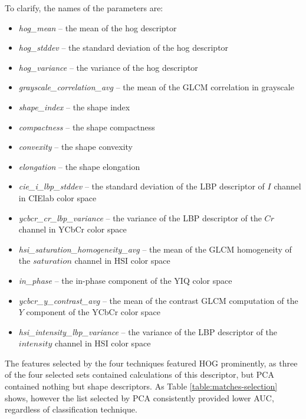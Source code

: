 \documentclass[letterpaper]{report}
\begin{document}
 To clarify, the names of the parameters are:
 \begin{itemize}
 	\item{\textit{hog\_mean} -- the mean of the hog descriptor}
 	\item{\textit{hog\_stddev} -- the standard deviation of the hog descriptor}
 	\item{\textit{hog\_variance} -- the variance of the hog descriptor}
 	\item{\textit{grayscale\_correlation\_avg} -- the mean of the GLCM correlation in grayscale}
 	\item{\textit{shape\_index} -- the shape index}
 	\item{\textit{compactness} -- the shape compactness}
 	\item{\textit{convexity} -- the shape convexity}
 	\item{\textit{elongation} -- the shape elongation}
 	\item{\textit{cie\_i\_lbp\_stddev} -- the standard deviation of the LBP descriptor of $I$ channel in CIElab color space}
 	\item{\textit{ycbcr\_cr\_lbp\_variance} -- the variance of the LBP descriptor of the $Cr$ channel in YCbCr color space}
 	\item{\textit{hsi\_saturation\_homogeneity\_avg} -- the mean of the GLCM homogeneity of the $saturation$ channel in HSI color space}
 	\item{\textit{in\_phase} -- the in-phase component of the YIQ color space}
 	\item{\textit{ycbcr\_y\_contrast\_avg} -- the mean of the contrast GLCM computation of the $Y$ component of the YCbCr color space}
 	\item{\textit{hsi\_intensity\_lbp\_variance} -- the variance of the LBP descriptor of the $intensity$ channel in HSI color space}
 \end{itemize}
 
The features selected by the four techniques featured HOG prominently, as three of the four selected sets contained calculations of this descriptor, but PCA contained nothing but shape descriptors. As Table \ref{table:matches-selection} shows, however the list selected by PCA consistently provided lower AUC, regardless of classification technique.
 	
\end{document}
